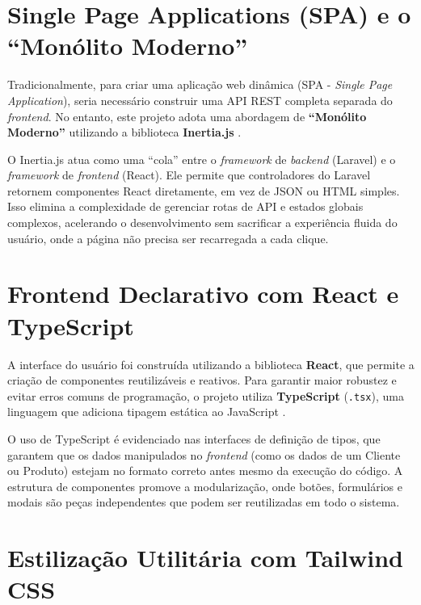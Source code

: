 \section{Single Page Applications (SPA) e o ``Monólito Moderno''}
\label{sec:inertia}

Tradicionalmente, para criar uma aplicação web dinâmica (SPA - \textit{Single Page Application}), seria necessário construir uma API REST completa separada do \textit{frontend}. No entanto, este projeto adota uma abordagem de \textbf{``Monólito Moderno''} utilizando a biblioteca \textbf{Inertia.js} \cite{inertia2024}.

O Inertia.js atua como uma ``cola'' entre o \textit{framework} de \textit{backend} (Laravel) e o \textit{framework} de \textit{frontend} (React). Ele permite que controladores do Laravel retornem componentes React diretamente, em vez de JSON ou HTML simples. Isso elimina a complexidade de gerenciar rotas de API e estados globais complexos, acelerando o desenvolvimento sem sacrificar a experiência fluida do usuário, onde a página não precisa ser recarregada a cada clique.

\section{Frontend Declarativo com React e TypeScript}
\label{sec:react}

A interface do usuário foi construída utilizando a biblioteca \textbf{React}, que permite a criação de componentes reutilizáveis e reativos. Para garantir maior robustez e evitar erros comuns de programação, o projeto utiliza \textbf{TypeScript} (\texttt{.tsx}), uma linguagem que adiciona tipagem estática ao JavaScript \cite{microsoft2024}.

O uso de TypeScript é evidenciado nas interfaces de definição de tipos, que garantem que os dados manipulados no \textit{frontend} (como os dados de um Cliente ou Produto) estejam no formato correto antes mesmo da execução do código. A estrutura de componentes promove a modularização, onde botões, formulários e modais são peças independentes que podem ser reutilizadas em todo o sistema.

\section{Estilização Utilitária com Tailwind CSS}
\label{sec:tailwind}

